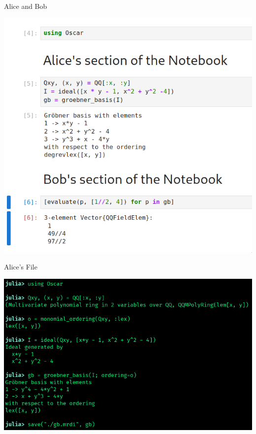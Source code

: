 \documentclass[9pt]{beamer}
\theoremstyle{definition}
\begin{document}
\begin{frame}[fragile]{Alice and Bob}
  \begin{center}
    \includegraphics[height=0.8\textheight]{images/notebook}
  \end{center}
\end{frame}


\begin{frame}[fragile]{Alice's File}
  \begin{center}
    \includegraphics[height=0.7\textheight]{images/separate}
  \end{center}
\end{frame}
\end{document}

